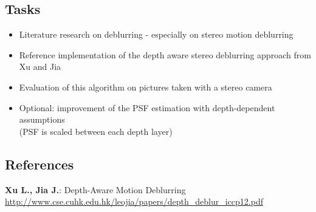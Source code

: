 \documentclass[a4paper, 12pt]{scrartcl}
\begin{document}
\subsection*{Tasks}
\begin{itemize}
\item Literature research on deblurring - especially on stereo motion deblurring
\item Reference implementation of the depth aware stereo deblurring approach from Xu and Jia
\item Evaluation of this algorithm on pictures taken with a stereo camera
\item Optional: improvement of the PSF estimation with depth-dependent assumptions \\(PSF is scaled between each depth layer)
\end{itemize}

\subsection*{References}
\textbf{Xu L., Jia J.}: Depth-Aware Motion Deblurring \\
\url{http://www.cse.cuhk.edu.hk/leojia/papers/depth_deblur_iccp12.pdf}

\end{document}
